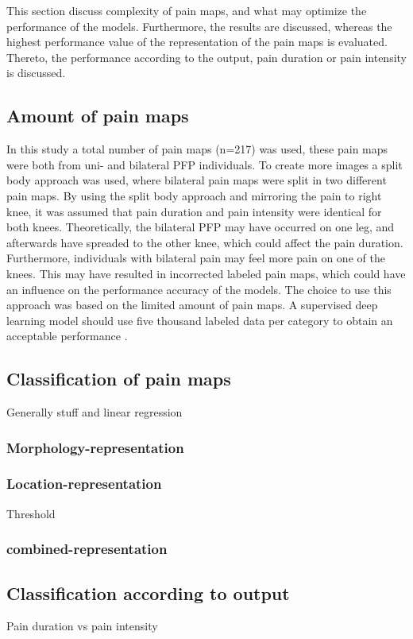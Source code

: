 This section discuss complexity of pain maps, and what may optimize the performance of the models. Furthermore, the results are discussed, whereas the highest performance value of the representation of the pain maps is evaluated. Thereto, the performance according to the output, pain duration or pain intensity is discussed.

\subsection*{Amount of pain maps}
In this study a total number of pain maps (n=217) was used, these pain maps were both from uni- and bilateral PFP individuals. To create more images a split body approach was used, where bilateral pain maps were split in two different pain maps. By using the split body approach and mirroring the pain to right knee, it was assumed that pain duration and pain intensity were identical for both knees. Theoretically, the bilateral PFP may have occurred on one leg, and afterwards have spreaded to the other knee, which could affect the pain duration. Furthermore, individuals with bilateral pain may feel more pain on one of the knees. This may have resulted in incorrected labeled pain maps, which could have an influence on the performance accuracy of the models. The choice to use this approach was based on the limited amount of pain maps. A supervised deep learning model should use five thousand labeled data per category to obtain an acceptable performance \citep{Goodfellow2016}. 


\subsection*{Classification of pain maps}
Generally stuff and linear regression
\subsubsection*{Morphology-representation}
\subsubsection*{Location-representation}
Threshold
\subsubsection*{combined-representation}



\subsection*{Classification according to output}
Pain duration vs pain intensity


